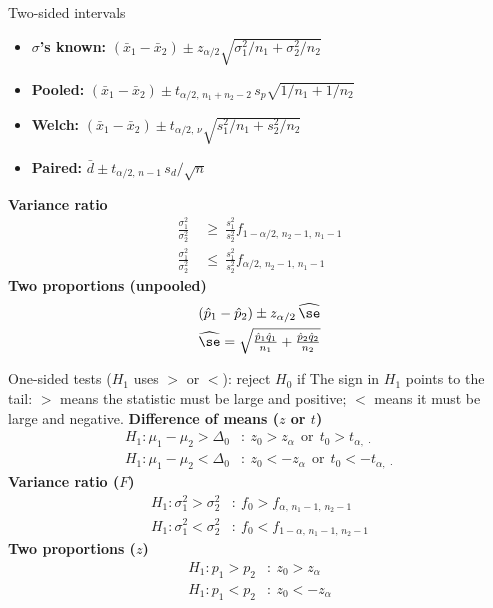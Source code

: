 \begin{formulabox}{Two-sided intervals}
\begin{itemize}
  \item \textbf{$\sigma$'s known:} $(\bar{x}_1-\bar{x}_2)\pm z_{\alpha/2}\sqrt{\sigma_1^2/n_1+\sigma_2^2/n_2}$
  \item \textbf{Pooled:} $(\bar{x}_1-\bar{x}_2)\pm t_{\alpha/2,\,n_1+n_2-2}\,s_p\sqrt{1/n_1+1/n_2}$
  \item \textbf{Welch:} $(\bar{x}_1-\bar{x}_2)\pm t_{\alpha/2,\,\nu}\sqrt{s_1^2/n_1+s_2^2/n_2}$
  \item \textbf{Paired:} $\bar{d}\pm t_{\alpha/2,\,n-1}\,s_d/\sqrt n$
\end{itemize}
\textbf{Variance ratio}
\[ \begin{aligned}\frac{\sigma_1^2}{\sigma_2^2}&\ \ge\ \frac{s_1^2}{s_2^2}f_{1-\alpha/2,\,n_2-1,\,n_1-1}\\[4pt] \frac{\sigma_1^2}{\sigma_2^2}&\ \le\ \frac{s_1^2}{s_2^2}f_{\alpha/2,\,n_2-1,\,n_1-1}\end{aligned} \]
\textbf{Two proportions (unpooled)}
\[ \begin{aligned}&(\hat{p}_1-\hat{p}_2)\pm z_{\alpha/2}\,\widehat{\se}\\ &\widehat{\se}=\sqrt{\tfrac{\hat{p}_1\hat{q}_1}{n_1}+\tfrac{\hat{p}_2\hat{q}_2}{n_2}}\end{aligned} \]
\end{formulabox}

\begin{formulabox}{One-sided tests ($H_1$ uses $>$ or $<$): reject $H_0$ if}
The sign in $H_1$ points to the tail: $>$ means the statistic must be large and positive; $<$ means it must be large and negative.
\textbf{Difference of means ($z$ or $t$)}
\[ \begin{aligned} H_1:\mu_1-\mu_2>\Delta_0&:\ z_0>z_\alpha\ \ \text{or}\ \ t_0>t_{\alpha,\,\cdot}\\ H_1:\mu_1-\mu_2<\Delta_0&:\ z_0<-z_\alpha\ \ \text{or}\ \ t_0<-t_{\alpha,\,\cdot}\end{aligned} \]
\textbf{Variance ratio ($F$)}
\[ \begin{aligned} H_1:\sigma_1^2>\sigma_2^2&:\ f_0>f_{\alpha,\,n_1-1,\,n_2-1}\\ H_1:\sigma_1^2<\sigma_2^2&:\ f_0<f_{1-\alpha,\,n_1-1,\,n_2-1}\end{aligned} \]
\textbf{Two proportions ($z$)}
\[ \begin{aligned} H_1:p_1>p_2&:\ z_0>z_\alpha\\ H_1:p_1<p_2&:\ z_0<-z_\alpha\end{aligned} \]
\end{formulabox}

